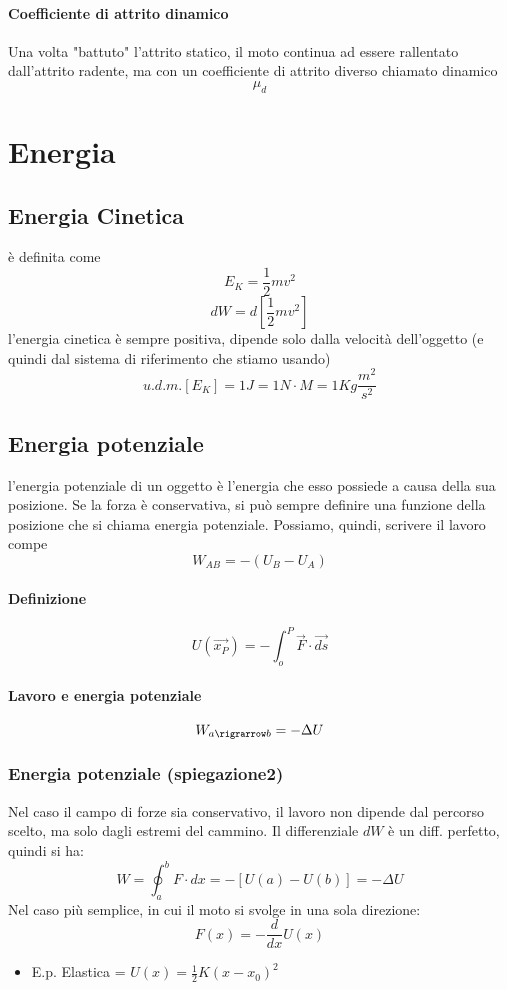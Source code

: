 \documentclass[a4paper]{report}
\begin{document}
  \paragraph{Coefficiente di attrito dinamico}
  Una volta "battuto" l'attrito statico, il moto continua ad essere rallentato dall'attrito radente, ma con un coefficiente di attrito diverso chiamato dinamico
  \[ \mu_d \]


  \section{Energia}
  \subsection{Energia Cinetica}
  è definita come
  \[ E_K = \frac{1}{2}m v^2 \]
  \[ dW = d[\frac{1}{2}m v^2] \]
  l'energia cinetica è sempre positiva, dipende solo dalla velocità dell'oggetto (e quindi dal sistema di riferimento che stiamo usando)
  \[ u.d.m.[E_K]= 1J = 1N\cdot M = 1 Kg \frac{m^2}{s^2}\]

  \subsection{Energia potenziale}
   l'energia potenziale di un oggetto è l'energia che esso possiede a causa della sua posizione.
   Se la forza è conservativa, si può sempre definire una funzione della posizione che si chiama energia potenziale.
   Possiamo, quindi, scrivere il lavoro compe
  \[ W_{AB} = -(U_B - U_A) \]
  \paragraph{Definizione}
  \[ U(\vec{x_P}) = - \int_o^P \vec{F}\cdot \vec{ds} \]
  \paragraph{Lavoro e energia potenziale}
  \[ W_{a\rigrarrow b} = -\Delta U \]



  \subsubsection{Energia potenziale (spiegazione2)}
  Nel caso il campo di forze sia conservativo, il lavoro non dipende dal percorso scelto, ma solo dagli estremi del cammino. Il differenziale $dW$ è un diff. perfetto, quindi si ha:
  \[W = \oint_a^b F \cdot dx = -[U(a) - U(b)] = -\Delta U\]
  Nel caso più semplice, in cui il moto si svolge in una sola direzione:
  \[ F(x) = -\frac{d}{dx}U(x) \]
  \begin{itemize}
    \item E.p. Elastica = \( U(x) = \frac{1}{2} K (x-x_0 )^2 \)
  \end{itemize}
\end{document}

